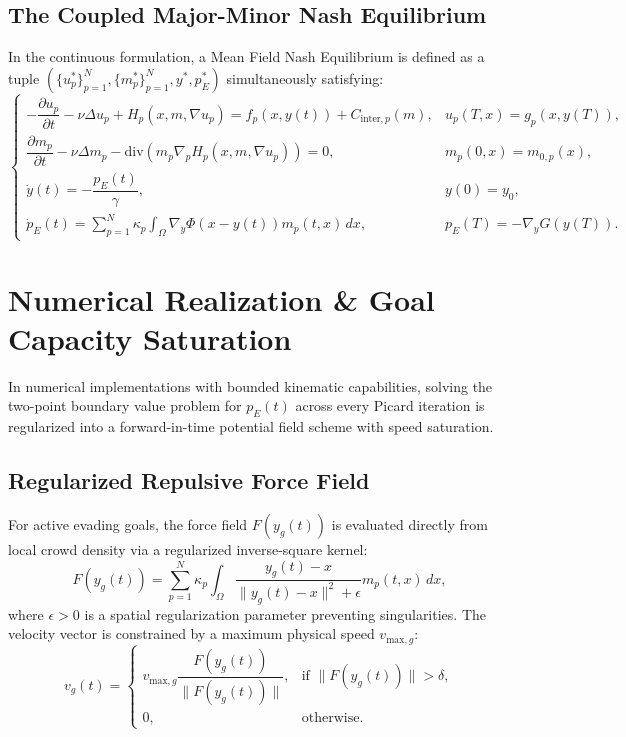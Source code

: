 \documentclass[11pt,a4paper]{article}
\begin{document}
\subsection{The Coupled Major-Minor Nash Equilibrium}
In the continuous formulation, a Mean Field Nash Equilibrium is defined as a tuple $( \{u_p^*\}_{p=1}^N, \{m_p^*\}_{p=1}^N, y^*, p_E^* )$ simultaneously satisfying:
\begin{equation}
\begin{cases}
-\dfrac{\partial u_p}{\partial t} - \nu \Delta u_p + H_p(x, m, \nabla u_p) = f_p(x, y(t)) + C_{\text{inter}, p}(m), & u_p(T, x) = g_p(x, y(T)), \\[8pt]
\dfrac{\partial m_p}{\partial t} - \nu \Delta m_p - \text{div}\left( m_p \nabla_p H_p(x, m, \nabla u_p) \right) = 0, & m_p(0, x) = m_{0, p}(x), \\[8pt]
\dot{y}(t) = -\dfrac{p_E(t)}{\gamma}, & y(0) = y_0, \\[8pt]
\dot{p}_E(t) = \sum_{p=1}^N \kappa_p \int_{\Omega} \nabla_y \Phi(x - y(t)) m_p(t, x) \, dx, & p_E(T) = -\nabla_y G(y(T)).
\end{cases}
\end{equation}

\section{Numerical Realization \& Goal Capacity Saturation}

In numerical implementations with bounded kinematic capabilities, solving the two-point boundary value problem for $p_E(t)$ across every Picard iteration is regularized into a forward-in-time potential field scheme with speed saturation.

\subsection{Regularized Repulsive Force Field}
For active evading goals, the force field $F(y_g(t))$ is evaluated directly from local crowd density via a regularized inverse-square kernel:
\begin{equation}
\label{eq:repulsion_force}
F(y_g(t)) = \sum_{p=1}^N \kappa_p \int_{\Omega} \frac{y_g(t) - x}{\|y_g(t) - x\|^2 + \epsilon} m_p(t, x) \, dx,
\end{equation}
where $\epsilon > 0$ is a spatial regularization parameter preventing singularities. The velocity vector is constrained by a maximum physical speed $v_{\text{max}, g}$:
\begin{equation}
v_g(t) = \begin{cases} 
v_{\text{max}, g} \dfrac{F(y_g(t))}{\|F(y_g(t))\|}, & \text{if } \|F(y_g(t))\| > \delta, \\[8pt]
0, & \text{otherwise.}
\end{cases}
\end{equation}
\end{document}
